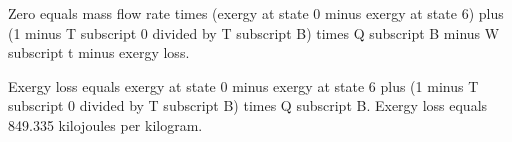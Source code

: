 Zero equals mass flow rate times (exergy at state 0 minus exergy at state 6) plus (1 minus T subscript 0 divided by T subscript B) times Q subscript B minus W subscript t minus exergy loss.  

Exergy loss equals exergy at state 0 minus exergy at state 6 plus (1 minus T subscript 0 divided by T subscript B) times Q subscript B.  
Exergy loss equals 849.335 kilojoules per kilogram.
